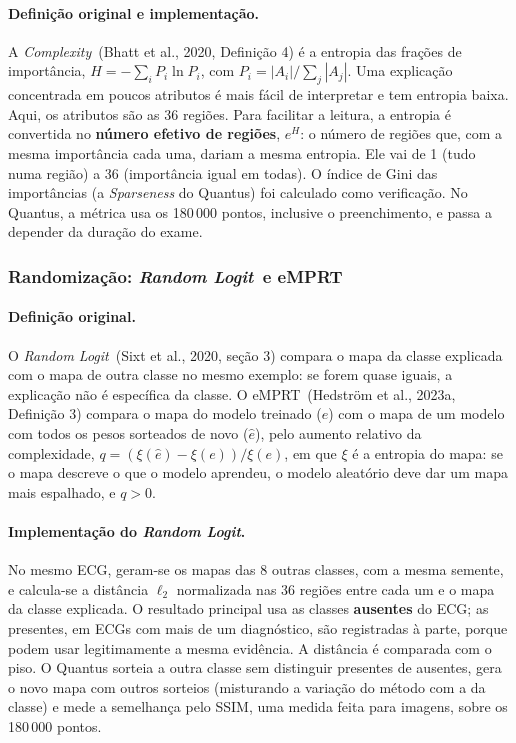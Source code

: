 \documentclass[11pt,a4paper]{article}
\newcommand{\CX}{\textit{Complexity}}
\newcommand{\RL}{\textit{Random Logit}}
\newcommand{\EM}{eMPRT}
\begin{document}
\paragraph{Definição original e implementação.} A \CX\ (Bhatt et al., 2020, Definição 4) é a entropia das frações de importância, $H = -\sum_i P_i \ln P_i$, com $P_i = |A_i| / \sum_j |A_j|$. Uma explicação concentrada em poucos atributos é mais fácil de interpretar e tem entropia baixa. Aqui, os atributos são as 36 regiões. Para facilitar a leitura, a entropia é convertida no \textbf{número efetivo de regiões}, $e^{H}$: o número de regiões que, com a mesma importância cada uma, dariam a mesma entropia. Ele vai de 1 (tudo numa região) a 36 (importância igual em todas). O índice de Gini das importâncias (a \textit{Sparseness} do Quantus) foi calculado como verificação. No Quantus, a métrica usa os 180\,000 pontos, inclusive o preenchimento, e passa a depender da duração do exame.

\subsubsection{Randomização: \RL\ e \EM}
\paragraph{Definição original.} O \RL\ (Sixt et al., 2020, seção 3) compara o mapa da classe explicada com o mapa de outra classe no mesmo exemplo: se forem quase iguais, a explicação não é específica da classe. O \EM\ (Hedström et al., 2023a, Definição 3) compara o mapa do modelo treinado ($e$) com o mapa de um modelo com todos os pesos sorteados de novo ($\hat{e}$), pelo aumento relativo da complexidade, $q = (\xi(\hat{e}) - \xi(e))/\xi(e)$, em que $\xi$ é a entropia do mapa: se o mapa descreve o que o modelo aprendeu, o modelo aleatório deve dar um mapa mais espalhado, e $q > 0$.

\paragraph{Implementação do \RL.} No mesmo ECG, geram-se os mapas das 8 outras classes, com a mesma semente, e calcula-se a distância $\ell_2$ normalizada nas 36 regiões entre cada um e o mapa da classe explicada. O resultado principal usa as classes \textbf{ausentes} do ECG; as presentes, em ECGs com mais de um diagnóstico, são registradas à parte, porque podem usar legitimamente a mesma evidência. A distância é comparada com o piso. O Quantus sorteia a outra classe sem distinguir presentes de ausentes, gera o novo mapa com outros sorteios (misturando a variação do método com a da classe) e mede a semelhança pelo SSIM, uma medida feita para imagens, sobre os 180\,000 pontos.
\end{document}

